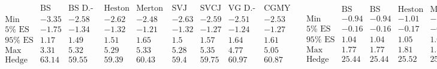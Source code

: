 \documentclass{article}
\begin{document}
\[\begin{array}{ccc}
 
\begin{array}{rrrrrrrrr}
 \text{} & \text{BS Delta} & \text{BS D.-Gamma} & \text{Heston D.-Vega} & \text{Merton D.-Gamma} & \text{SVJ D.-Vega} & \text{SVCJ D.-Vega} & \text{VG
D.-Gamma} & \text{CGMY D.-Gamma} \\
 \text{Min} & -3.35 & -2.58 & -2.62 & -2.48 & -2.63 & -2.59 & -2.51 & -2.53 \\
 \text{5$\%$ ES} & -1.75 & -1.34 & -1.32 & -1.21 & -1.32 & -1.27 & -1.24 & -1.27 \\
 \text{95$\%$ ES} & 1.17 & 1.49 & 1.51 & 1.65 & 1.5 & 1.57 & 1.64 & 1.61 \\
 \text{Max} & 3.31 & 5.32 & 5.29 & 5.33 & 5.28 & 5.35 & 4.77 & 5.05 \\
 \text{Hedge error} & 63.14 & 59.55 & 59.39 & 60.43 & 59.4 & 59.75 & 60.97 & 60.87 \\
\end{array}
 & 
\begin{array}{rrrrrrrrr}
 \text{} & \text{BS Delta} & \text{BS Delta} & \text{Heston MV} & \text{Merton Delta} & \text{SVJ MV} & \text{SVCJ MV} & \text{VG Delta} & \text{CGMY
Delta} \\
 \text{Min} & -0.94 & -0.94 & -1.01 & -1.07 & -1.03 & -1.1 & -1.16 & -1.18 \\
 \text{5$\%$ ES} & -0.16 & -0.16 & -0.17 & -0.19 & -0.15 & -0.15 & -0.2 & -0.2 \\
 \text{95$\%$ ES} & 1.04 & 1.04 & 1.05 & 1.03 & 1.07 & 1.09 & 1.08 & 1.08 \\
 \text{Max} & 1.77 & 1.77 & 1.81 & 1.8 & 1.91 & 1.86 & 1.8 & 1.81 \\
 \text{Hedge error} & 25.44 & 25.44 & 25.52 & 25.97 & 25.78 & 26.01 & 26.8 & 26.87 \\
\end{array}
 & 
\begin{array}{rrrrrrrrr}
 \text{} & \text{BS Delta} & \text{BS Delta} & \text{Heston MV} & \text{Merton Delta} & \text{SVJ MV} & \text{SVCJ MV} & \text{VG Delta} & \text{CGMY
Delta} \\
 \text{Min} & -1.39 & -1.39 & -1.28 & -1.38 & -1.29 & -1.23 & -1.39 & -1.39 \\
 \text{5$\%$ ES} & -0.49 & -0.49 & -0.46 & -0.55 & -0.51 & -0.39 & -0.48 & -0.48 \\
 \text{95$\%$ ES} & 0.88 & 0.88 & 0.89 & 0.83 & 0.87 & 0.96 & 0.88 & 0.88 \\
 \text{Max} & 1.37 & 1.37 & 1.39 & 1.33 & 1.38 & 1.54 & 1.44 & 1.43 \\
 \text{Hedge error} & 30.21 & 30.21 & 29.52 & 30.3 & 30.08 & 30.78 & 29.62 & 29.56 \\
\end{array}
 \\
 

\end{array}\]
\end{document}
